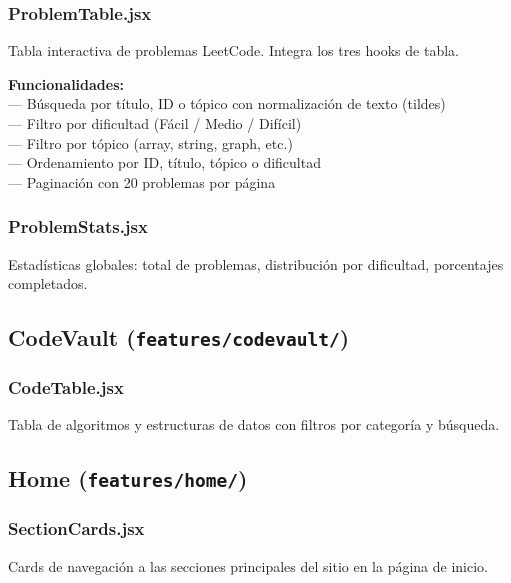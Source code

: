 \documentclass[12pt,a4paper]{article}
\begin{document}
\subsubsection{ProblemTable.jsx}

Tabla interactiva de problemas LeetCode. Integra los tres hooks de tabla.

\begin{mdframed}[style=propbox]
\textbf{Funcionalidades:}\\
--- Búsqueda por título, ID o tópico con normalización de texto (tildes)\\
--- Filtro por dificultad (Fácil / Medio / Difícil)\\
--- Filtro por tópico (array, string, graph, etc.)\\
--- Ordenamiento por ID, título, tópico o dificultad\\
--- Paginación con 20 problemas por página
\end{mdframed}

\subsubsection{ProblemStats.jsx}

Estadísticas globales: total de problemas, distribución por dificultad, porcentajes completados.

\subsection{CodeVault (\texttt{features/codevault/})}

\subsubsection{CodeTable.jsx}

Tabla de algoritmos y estructuras de datos con filtros por categoría y búsqueda.

\subsection{Home (\texttt{features/home/})}

\subsubsection{SectionCards.jsx}

Cards de navegación a las secciones principales del sitio en la página de inicio.
\end{document}
